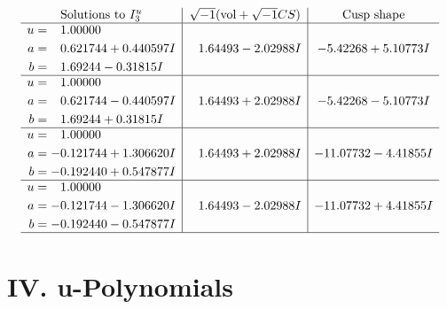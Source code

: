 \documentclass[1p]{elsarticle_modified}
\theoremstyle{definition}
\newcommand{\I}{\sqrt{-1}}
\begin{document}
$$\begin{array}{c|c|c}  
\text{Solutions to }I^u_{3}& \I (\text{vol} + \sqrt{-1}CS) & \text{Cusp shape}\\
 \hline 
\begin{aligned}
u &= \phantom{-}1.00000\phantom{ +0.000000I} \\
a &= \phantom{-}0.621744 + 0.440597 I \\
b &= \phantom{-}1.69244 - 0.31815 I\end{aligned}
 & \phantom{-}1.64493 - 2.02988 I & -5.42268 + 5.10773 I \\ \hline\begin{aligned}
u &= \phantom{-}1.00000\phantom{ +0.000000I} \\
a &= \phantom{-}0.621744 - 0.440597 I \\
b &= \phantom{-}1.69244 + 0.31815 I\end{aligned}
 & \phantom{-}1.64493 + 2.02988 I & -5.42268 - 5.10773 I \\ \hline\begin{aligned}
u &= \phantom{-}1.00000\phantom{ +0.000000I} \\
a &= -0.121744 + 1.306620 I \\
b &= -0.192440 + 0.547877 I\end{aligned}
 & \phantom{-}1.64493 + 2.02988 I & -11.07732 - 4.41855 I \\ \hline\begin{aligned}
u &= \phantom{-}1.00000\phantom{ +0.000000I} \\
a &= -0.121744 - 1.306620 I \\
b &= -0.192440 - 0.547877 I\end{aligned}
 & \phantom{-}1.64493 - 2.02988 I & -11.07732 + 4.41855 I\\
 \hline 
 \end{array}$$\newpage
\newpage\renewcommand{\arraystretch}{1}
\centering \section*{ IV. u-Polynomials}
\end{document}
